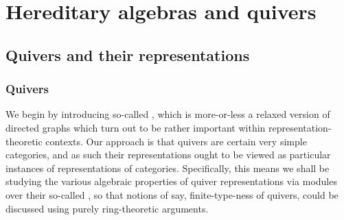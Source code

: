 \section{Hereditary algebras and quivers}
    \subsection{Quivers and their representations}
        \subsubsection{Quivers}
            We begin by introducing so-called , which is more-or-less a relaxed version of directed graphs which turn out to be rather important within representation-theoretic contexts. Our approach is that quivers are certain very simple categories, and as such their representations ought to be viewed as particular instances of representations of categories. Specifically, this means we shall be studying the various algebraic properties of quiver representations via modules over their so-called , so that notions of say, finite-type-ness of quivers, could be discussed using purely ring-theoretic arguments.
        
